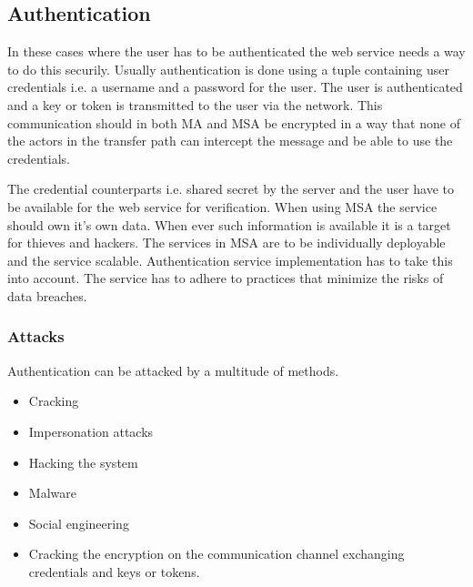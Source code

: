\subsection{Authentication}
\begin{sloppypar}
    In these cases where the user has to be authenticated the web service needs 
    a way to do this securily. Usually authentication is done using a tuple 
    containing user credentials i.e. a username and a password for the user. The
    user is authenticated and a key or token is transmitted to the user via the 
    network. This communication should in both MA and MSA be encrypted in a way 
    that none of the actors in the transfer path can intercept the message and 
    be able to use the credentials.
\end{sloppypar}
\begin{sloppypar}
    The credential counterparts i.e. shared secret by the server and the user 
    have to be available for the web service for verification. When using MSA 
    the service should own it's own data. When ever such information is 
    available it is a target for thieves and hackers. The services in MSA are 
    to be individually deployable and the service scalable. Authentication 
    service implementation has to take this into account. The service has to 
    adhere to practices that minimize the risks of data breaches. 
\end{sloppypar}
    
\subsubsection{Attacks}
\begin{sloppypar}
    Authentication can be attacked by a multitude of methods.     
    \begin{itemize}
        \item Cracking
        \item Impersonation attacks
        \item Hacking the system
        \item Malware
        \item Social engineering
        \item Cracking the encryption on the communication channel exchanging credentials and keys or tokens.
    \end{itemize}
\end{sloppypar}

